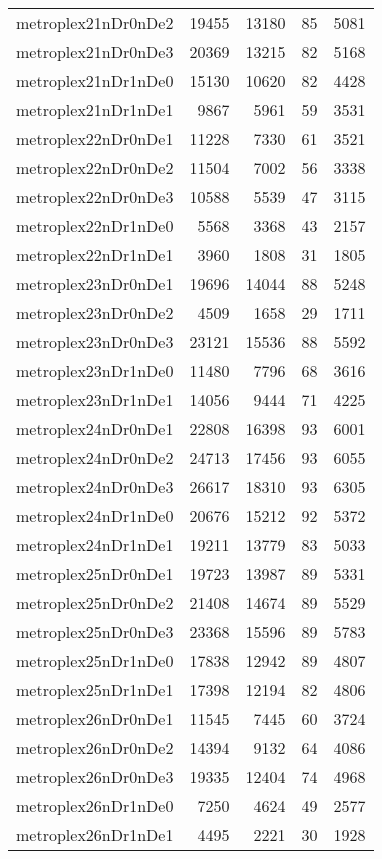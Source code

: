 \begin{longtable}{lrrrr}
metroplex21nDr0nDe2 & 19455 & 13180 & 85 & 5081 \\
metroplex21nDr0nDe3 & 20369 & 13215 & 82 & 5168 \\
metroplex21nDr1nDe0 & 15130 & 10620 & 82 & 4428 \\
metroplex21nDr1nDe1 & 9867 & 5961 & 59 & 3531 \\
metroplex22nDr0nDe1 & 11228 & 7330 & 61 & 3521 \\
metroplex22nDr0nDe2 & 11504 & 7002 & 56 & 3338 \\
metroplex22nDr0nDe3 & 10588 & 5539 & 47 & 3115 \\
metroplex22nDr1nDe0 & 5568 & 3368 & 43 & 2157 \\
metroplex22nDr1nDe1 & 3960 & 1808 & 31 & 1805 \\
metroplex23nDr0nDe1 & 19696 & 14044 & 88 & 5248 \\
metroplex23nDr0nDe2 & 4509 & 1658 & 29 & 1711 \\
metroplex23nDr0nDe3 & 23121 & 15536 & 88 & 5592 \\
metroplex23nDr1nDe0 & 11480 & 7796 & 68 & 3616 \\
metroplex23nDr1nDe1 & 14056 & 9444 & 71 & 4225 \\
metroplex24nDr0nDe1 & 22808 & 16398 & 93 & 6001 \\
metroplex24nDr0nDe2 & 24713 & 17456 & 93 & 6055 \\
metroplex24nDr0nDe3 & 26617 & 18310 & 93 & 6305 \\
metroplex24nDr1nDe0 & 20676 & 15212 & 92 & 5372 \\
metroplex24nDr1nDe1 & 19211 & 13779 & 83 & 5033 \\
metroplex25nDr0nDe1 & 19723 & 13987 & 89 & 5331 \\
metroplex25nDr0nDe2 & 21408 & 14674 & 89 & 5529 \\
metroplex25nDr0nDe3 & 23368 & 15596 & 89 & 5783 \\
metroplex25nDr1nDe0 & 17838 & 12942 & 89 & 4807 \\
metroplex25nDr1nDe1 & 17398 & 12194 & 82 & 4806 \\
metroplex26nDr0nDe1 & 11545 & 7445 & 60 & 3724 \\
metroplex26nDr0nDe2 & 14394 & 9132 & 64 & 4086 \\
metroplex26nDr0nDe3 & 19335 & 12404 & 74 & 4968 \\
metroplex26nDr1nDe0 & 7250 & 4624 & 49 & 2577 \\
metroplex26nDr1nDe1 & 4495 & 2221 & 30 & 1928 \\

\end{longtable}
